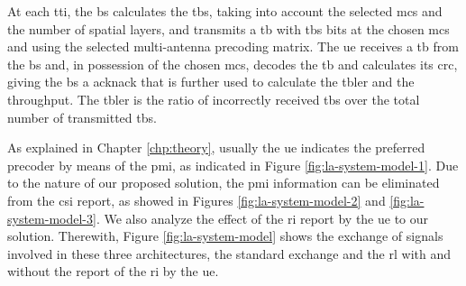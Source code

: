 
At each \gls{tti}, the \gls{bs} calculates the \gls{tbs}, taking into account the selected \gls{mcs} and the number of spatial layers, and transmits a \gls{tb} with \gls{tbs} bits at the chosen \gls{mcs} and using the selected multi-antenna precoding matrix.
%
The \gls{ue} receives a \gls{tb} from the \gls{bs} and, in possession of the chosen \gls{mcs}, decodes the \gls{tb} and calculates its \gls{crc}, giving the \gls{bs} a \gls{acknack} that is further used to calculate the \gls{tbler} and the throughput.
%
The \gls{tbler} is the ratio of incorrectly received \gls{tb}s over the total number of transmitted \gls{tb}s.
%
%

As explained in Chapter \ref{chp:theory}, usually the \gls{ue} indicates the preferred precoder by means of the \gls{pmi}, as indicated in Figure \ref{fig:la-system-model-1}.
%
Due to the nature of our proposed solution, the \gls{pmi} information can be eliminated from the \gls{csi} report, as showed in Figures \ref{fig:la-system-model-2} and \ref{fig:la-system-model-3}.
%
We also analyze the effect of the \gls{ri} report by the \gls{ue} to our solution.
%
Therewith, Figure \ref{fig:la-system-model} shows the exchange of signals involved in these three architectures, the standard exchange and the \gls{rl} with and without the report of the \gls{ri} by the \gls{ue}.

